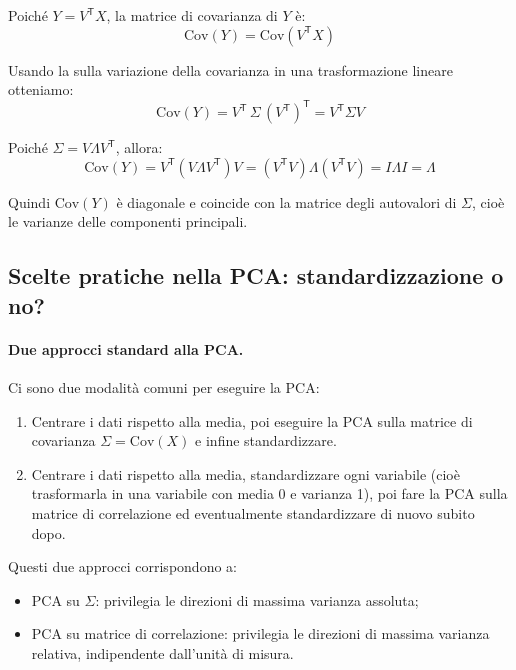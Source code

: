 \begin{dimostrazione}{}{}
Poiché \( Y = V^\mathsf{T} X \), la matrice di covarianza di \( Y \) è:
\[
\mathrm{Cov}(Y) = \mathrm{Cov}(V^\mathsf{T} X)
\]

Usando la  sulla variazione della covarianza in una trasformazione lineare otteniamo:
\[
    \mathrm{Cov}(Y) 
    = V^\mathsf{T} \, \Sigma \, (V^\mathsf{T})^\mathsf{T}
    = V^\mathsf{T} \Sigma V
\]

Poiché \( \Sigma = V \Lambda V^\mathsf{T} \), allora:
\[
\mathrm{Cov}(Y) = V^\mathsf{T} (V \Lambda V^\mathsf{T}) V = (V^\mathsf{T} V) \Lambda (V^\mathsf{T} V) = I \Lambda I = \Lambda
\]

Quindi \( \mathrm{Cov}(Y) \) è diagonale e coincide con la matrice degli autovalori di \( \Sigma \), cioè le varianze delle componenti principali.
\end{dimostrazione}

\subsection{Scelte pratiche nella PCA: standardizzazione o no?}

\paragraph{Due approcci standard alla PCA.}
Ci sono due modalità comuni per eseguire la PCA:

\begin{enumerate}
  \item Centrare i dati rispetto alla media, poi eseguire la PCA sulla matrice di covarianza \( \Sigma = \mathrm{Cov}(X) \) e infine standardizzare.
  \item Centrare i dati rispetto alla media, standardizzare ogni variabile (cioè trasformarla in una variabile con media 0 e varianza 1), poi fare la PCA sulla matrice di correlazione ed eventualmente standardizzare di nuovo subito dopo.
\end{enumerate}

Questi due approcci corrispondono a:

\begin{itemize}
  \item PCA su \( \Sigma \): privilegia le direzioni di massima varianza assoluta;
  \item PCA su matrice di correlazione: privilegia le direzioni di massima varianza relativa, indipendente dall'unità di misura.
\end{itemize}

